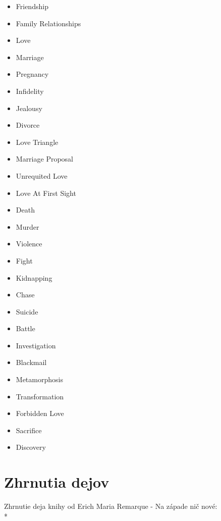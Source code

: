 \begin{minipage}[t]{.5\textwidth}
       \begin{itemize}
        \item Friendship
        \item Family Relationships
        \item Love
        \item Marriage
        \item Pregnancy
        \item Infidelity
        \item Jealousy
        \item Divorce
        \item Love Triangle
        \item Marriage Proposal
        \item Unrequited Love  
        \item Love At First Sight
        \item Death
        \item Murder
        \item Violence
        \item Fight
        \item Kidnapping
        \item Chase
        \item Suicide
        \item Battle
        \item Investigation
        \item Blackmail
        \item Metamorphosis
        \item Transformation
        \item Forbidden Love
        \item Sacrifice
        \item Discovery
    \end{itemize}
\end{minipage}


\chapter{Zhrnutia dejov} \label{priloha-zhntuia}

Zhrnutie deja knihy od Erich Maria Remarque - Na západe nič nové:\\*

